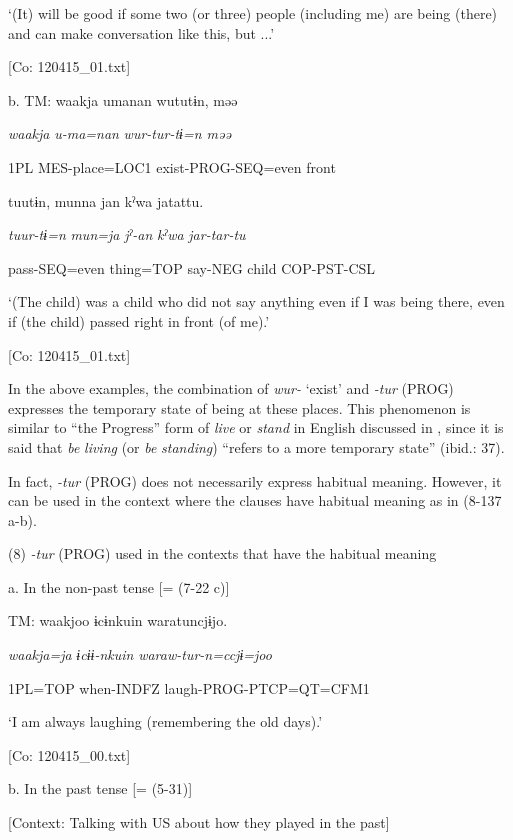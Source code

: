       ‘(It) will be good if some two (or three) people (including me) are being (there) and can make conversation like this, but ...’

      [Co: 120415\_01.txt]

  b.  TM:  waakja  umanan  wututɨn,  məə

      \textit{waakja}  \textit{u-ma=nan}  \textit{wur-tur{}-tɨ=n  məə}

      1PL  MES-place=LOC1  exist-PROG-SEQ=even  front

      tuutɨn,  munna  jan  kˀwa  jatattu.

      \textit{tuur-tɨ=n}  \textit{mun=ja}  \textit{jˀ-an}  \textit{kˀwa}  \textit{jar-tar-tu}

      pass-SEQ=even  thing=TOP  say-NEG  child  COP-PST-CSL

      ‘(The child) was a child who did not say anything even if I was being there, even if (the child) passed right in front (of me).’

      [Co: 120415\_01.txt]

In the above examples, the combination of \textit{wur-} ‘exist’ and \textit{{}-tur} (PROG) expresses the temporary state of being at these places. This phenomenon is similar to “the Progress” form of \textit{live} or \textit{stand} in English discussed in \citet{Comrie1976}, since it is said that \textit{be} \textit{living} (or \textit{be} \textit{standing}) “refers to a more temporary state” (ibid.: 37).

  In fact, \textit{{}-tur} (PROG) does not necessarily express habitual meaning. However, it can be used in the context where the clauses have habitual meaning as in (8-137 a-b).

(8)  \textit{{}-tur} (PROG) used in the contexts that have the habitual meaning

  a.  In the non-past tense [= (7-22 c)]

    TM:  waakjoo  ɨcɨnkuin  waratuncjɨjo.

      \textit{waakja=ja}  \textit{ɨcɨɨ-nkuin}  \textit{waraw-tur{}-n=ccjɨ=joo}

      1PL=TOP  when-INDFZ  laugh-PROG-PTCP=QT=CFM1

      ‘I am always laughing (remembering the old days).’

      [Co: 120415\_00.txt]

  b.  In the past tense [= (5-31)]

    [Context: Talking with US about how they played in the past]

